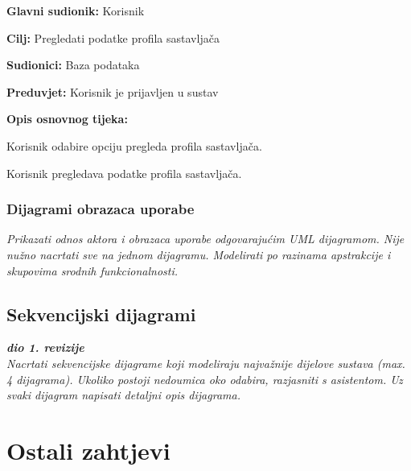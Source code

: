 				\noindent {}
				\begin{packed_item}
					
					\item \textbf{Glavni sudionik: }Korisnik
					\item  \textbf{Cilj:} Pregledati podatke profila sastavljača
					\item  \textbf{Sudionici:} Baza podataka
					\item  \textbf{Preduvjet:} Korisnik je prijavljen u sustav
					\item  \textbf{Opis osnovnog tijeka:}
					
					\item[] \begin{packed_enum}
						
						\item Korisnik odabire opciju pregleda profila sastavljača.
						\item Korisnik pregledava podatke profila sastavljača.
					\end{packed_enum}
					
				\end{packed_item}

				
			
			
				
					
				\subsubsection{Dijagrami obrazaca uporabe}
					
					\textit{Prikazati odnos aktora i obrazaca uporabe odgovarajućim UML dijagramom. Nije nužno nacrtati sve na jednom dijagramu. Modelirati po razinama apstrakcije i skupovima srodnih funkcionalnosti.}
				\eject		
				
			\subsection{Sekvencijski dijagrami}
				
				\textbf{\textit{dio 1. revizije}}\\
				
				\textit{Nacrtati sekvencijske dijagrame koji modeliraju najvažnije dijelove sustava (max. 4 dijagrama). Ukoliko postoji nedoumica oko odabira, razjasniti s asistentom. Uz svaki dijagram napisati detaljni opis dijagrama.}
				\eject
	
		\section{Ostali zahtjevi}
		
